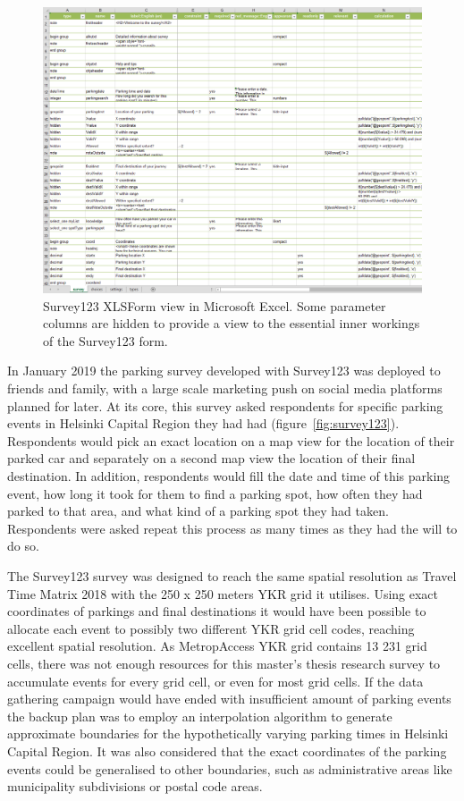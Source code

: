 \begin{figure}[H]%
    \includegraphics[width=\textwidth]{images/survey123_xlsform.png}
    \caption[Survey123 XLSForm view]{Survey123 XLSForm view in Microsoft Excel. Some parameter columns are hidden to provide a view to the essential inner workings of the Survey123 form.}%
    \label{fig:survey123_xlsform}%
\end{figure}

In January 2019 the parking survey developed with Survey123 was deployed to friends and family, with a large scale marketing push on social media platforms planned for later. At its core, this survey asked respondents for specific parking events in Helsinki Capital Region they had had (figure~\ref{fig:survey123}). Respondents would pick an exact location on a map view for the location of their parked car and separately on a second map view the location of their final destination. In addition, respondents would fill the date and time of this parking event, how long it took for them to find a parking spot, how often they had parked to that area, and what kind of a parking spot they had taken. Respondents were asked repeat this process as many times as they had the will to do so.

The Survey123 survey was designed to reach the same spatial resolution as Travel Time Matrix 2018 with the 250 x 250 meters YKR grid it utilises. Using exact coordinates of parkings and final destinations it would have been possible to allocate each event to possibly two different YKR grid cell codes, reaching excellent spatial resolution. As MetropAccess YKR grid contains 13 231 grid cells, there was not enough resources for this master's thesis research survey to accumulate events for every grid cell, or even for most grid cells. If the data gathering campaign would have ended with insufficient amount of parking events the backup plan was to employ an interpolation algorithm to generate approximate boundaries for the hypothetically varying parking times in Helsinki Capital Region. It was also considered that the exact coordinates of the parking events could be generalised to other boundaries, such as administrative areas like municipality subdivisions or postal code areas. 

